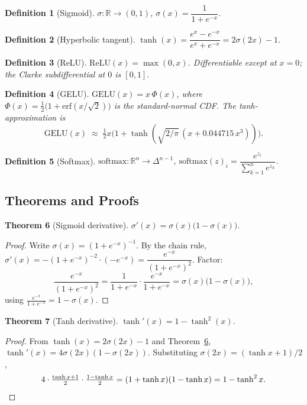 \documentclass[11pt]{article}
\newtheorem{theorem}{Theorem}[section]
\newtheorem{definition}[theorem]{Definition}
\theoremstyle{remark}
\begin{document}
\begin{definition}[Sigmoid]
$\sigma:\mathbb{R}\to(0,1)$, $\sigma(x) = \dfrac{1}{1+e^{-x}}$.
\end{definition}

\begin{definition}[Hyperbolic tangent]
$\tanh(x) = \dfrac{e^x-e^{-x}}{e^x+e^{-x}} = 2\sigma(2x)-1$.
\end{definition}

\begin{definition}[ReLU]
$\mathrm{ReLU}(x) = \max(0,x)$. Differentiable except at $x=0$; the Clarke subdifferential at $0$ is $[0,1]$.
\end{definition}

\begin{definition}[GELU]
$\mathrm{GELU}(x) = x\,\Phi(x)$, where $\Phi(x) = \tfrac{1}{2}\bigl(1 + \mathrm{erf}(x/\sqrt{2})\bigr)$ is the standard-normal CDF. The tanh-approximation is
\[
\mathrm{GELU}(x) \;\approx\; \tfrac{1}{2}x\bigl(1 + \tanh(\sqrt{2/\pi}\,(x + 0.044715\,x^3))\bigr).
\]
\end{definition}

\begin{definition}[Softmax]
$\mathrm{softmax}:\mathbb{R}^n\to\Delta^{n-1}$, $\mathrm{softmax}(z)_i = \dfrac{e^{z_i}}{\sum_{k=1}^n e^{z_k}}$.
\end{definition}

\subsection*{Theorems and Proofs}

\begin{theorem}[Sigmoid derivative]\label{thm:sig}
$\sigma'(x) = \sigma(x)\bigl(1-\sigma(x)\bigr)$.
\end{theorem}
\begin{proof}
Write $\sigma(x)=(1+e^{-x})^{-1}$. By the chain rule,
$\sigma'(x) = -(1+e^{-x})^{-2}\cdot(-e^{-x}) = \dfrac{e^{-x}}{(1+e^{-x})^2}$. Factor:
\[
\frac{e^{-x}}{(1+e^{-x})^2} = \frac{1}{1+e^{-x}}\cdot\frac{e^{-x}}{1+e^{-x}} = \sigma(x)\bigl(1-\sigma(x)\bigr),
\]
using $\frac{e^{-x}}{1+e^{-x}} = 1-\sigma(x)$.
\end{proof}

\begin{theorem}[Tanh derivative]
$\tanh'(x) = 1-\tanh^2(x)$.
\end{theorem}
\begin{proof}
From $\tanh(x) = 2\sigma(2x)-1$ and Theorem~\ref{thm:sig},
$\tanh'(x) = 4\sigma(2x)(1-\sigma(2x))$. Substituting $\sigma(2x) = (\tanh x + 1)/2$,
\[
4\cdot\tfrac{\tanh x+1}{2}\cdot\tfrac{1-\tanh x}{2} = (1+\tanh x)(1-\tanh x) = 1-\tanh^2 x. \qedhere
\]
\end{proof}
\end{document}
